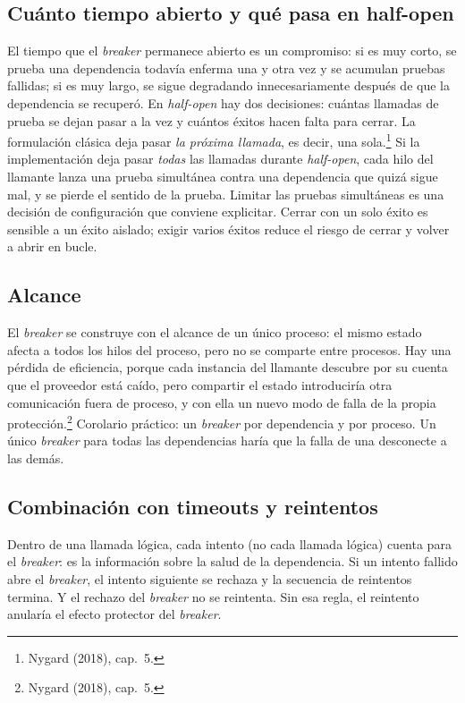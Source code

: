 \documentclass[variant=apuntes,cover=institutional,mode=screen]{ua-engineering-v6-article}
\begin{document}
\subsection{Cuánto tiempo abierto y qué pasa en half-open}

El tiempo que el \emph{breaker} permanece abierto es un compromiso: si es muy corto, se prueba una dependencia todavía enferma una y otra vez y se acumulan pruebas fallidas; si es muy largo, se sigue degradando innecesariamente después de que la dependencia se recuperó. En \emph{half-open} hay dos decisiones: cuántas llamadas de prueba se dejan pasar a la vez y cuántos éxitos hacen falta para cerrar. La formulación clásica deja pasar \emph{la próxima llamada}, es decir, una sola.\footnote{Nygard (2018), cap.~5.} Si la implementación deja pasar \emph{todas} las llamadas durante \emph{half-open}, cada hilo del llamante lanza una prueba simultánea contra una dependencia que quizá sigue mal, y se pierde el sentido de la prueba. Limitar las pruebas simultáneas es una decisión de configuración que conviene explicitar. Cerrar con un solo éxito es sensible a un éxito aislado; exigir varios éxitos reduce el riesgo de cerrar y volver a abrir en bucle.

\subsection{Alcance}

El \emph{breaker} se construye con el alcance de un único proceso: el mismo estado afecta a todos los hilos del proceso, pero no se comparte entre procesos. Hay una pérdida de eficiencia, porque cada instancia del llamante descubre por su cuenta que el proveedor está caído, pero compartir el estado introduciría otra comunicación fuera de proceso, y con ella un nuevo modo de falla de la propia protección.\footnote{Nygard (2018), cap.~5.} Corolario práctico: un \emph{breaker} por dependencia y por proceso. Un único \emph{breaker} para todas las dependencias haría que la falla de una desconecte a las demás.

\subsection{Combinación con timeouts y reintentos}

Dentro de una llamada lógica, cada intento (no cada llamada lógica) cuenta para el \emph{breaker}: es la información sobre la salud de la dependencia. Si un intento fallido abre el \emph{breaker}, el intento siguiente se rechaza y la secuencia de reintentos termina. Y el rechazo del \emph{breaker} no se reintenta. Sin esa regla, el reintento anularía el efecto protector del \emph{breaker}.
\end{document}
